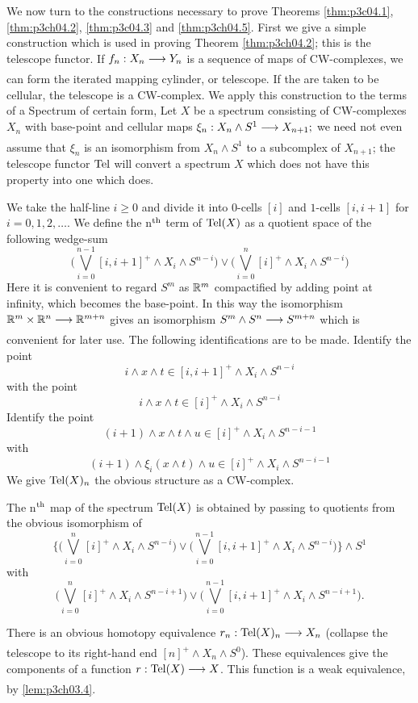 \documentclass[../main]{subfiles}
\begin{document}
We now turn to the constructions necessary to prove Theorems \ref{thm:p3c04.1},
\ref{thm:p3ch04.2}, \ref{thm:p3c04.3} and \ref{thm:p3ch04.5}. First we give a simple construction which is used in
proving Theorem \ref{thm:p3ch04.2}; this is the telescope functor. If $f_n:X_n\lar{}Y_n$
is a sequence of maps of CW-complexes, we can form the iterated
mapping cylinder, or telescope. If the are taken to be cellular, the
telescope is a CW-complex. We apply this construction to the terms of
a Spectrum of certain form, Let $X$ be a spectrum consisting of CW-complexes $X_n$ with base-point and cellular maps $\xi_n:X_n\wedge S^1\lar{}X_{n+1} ;$
 we need not even assume that $\xi_n$ is an isomorphism from $X_n\wedge S^1$ to a
subcomplex of $X_{n+1}$; the telescope functor $\mathrm{Tel}$  will convert a spectrum
$X$ which does not have this property into one which does. 

We take the half-line $i\geq 0$ and divide it into $0$-cells $[i]$ and $1$-cells $[i,i+1]$ for $i=0,1,2,\dots$. We define the n$^{\text{th}}$ term of $\mathrm{Tel}(X)$ as a quotient space of the following wedge-sum
\[\bigg(\bigvee_{i=0}^{n-1} [i,i+1]^+\wedge X_i\wedge S^{n-i} \bigg)\vee \bigg(\bigvee_{i=0}^n [i]^+\wedge X_i\wedge S^{n-i}\bigg) \]
Here it is convenient to regard $S^m$ as $\mathbb{R}^m$ compactified by adding point at infinity, which becomes the base-point. In this way the isomorphism $\bR^m\times \bR^n \lar{} \bR^{m+n}$ gives an isomorphism $S^m\wedge S^n \lar{} S^{m+n}$ which is convenient for later use. The following identifications are to
be made. Identify the point 
\[i\wedge x\wedge t\in [i,i+1]^+ \wedge X_i \wedge S^{n-i} \]
with the point \[i\wedge x\wedge t \in [i]^+\wedge X_i\wedge S^{n-i} \]
Identify the point \[(i+1)\wedge x\wedge t\wedge u\in [i]^+\wedge X_i\wedge S^{n-i-1}\]
with
\[(i+1)\wedge \xi_i(x\wedge t)\wedge u\in [i]^+\wedge X_i\wedge S^{n-i-1}\]
We give $\mathrm{Tel}(X)_n$ the obvious structure as a CW-complex.

The n$^{\text{th}}$ map of the spectrum $\mathrm{Tel}(X)$ is obtained by passing to quotients from the obvious isomorphism of \[\bigg\{\bigg(\bigvee_{i=0}^n [i]^+\wedge X_i\wedge S^{n-i}\bigg)\vee \bigg(\bigvee_{i=0}^{n-1} [i,i+1]^+\wedge X_i\wedge S^{n-i} \bigg) \bigg\}\wedge S^1 \]
with 
\[\bigg(\bigvee_{i=0}^n [i]^+\wedge X_i\wedge S^{n-i+1}\bigg)\vee \bigg(\bigvee_{i=0}^{n-1} [i,i+1]^+\wedge X_i\wedge S^{n-i+1} \bigg).\]

There is an obvious homotopy equivalence $r_n:\te{Tel}(X)_n\lar{}X_n$ (collapse the telescope to its right-hand end $[n]^+\wedge X_n\wedge S^0$). These equivalences give the components of a function $r:\te{Tel}(X)\lar{}X$. This function is a weak equivalence, by \ref{lem:p3ch03.4}.
\end{document}

